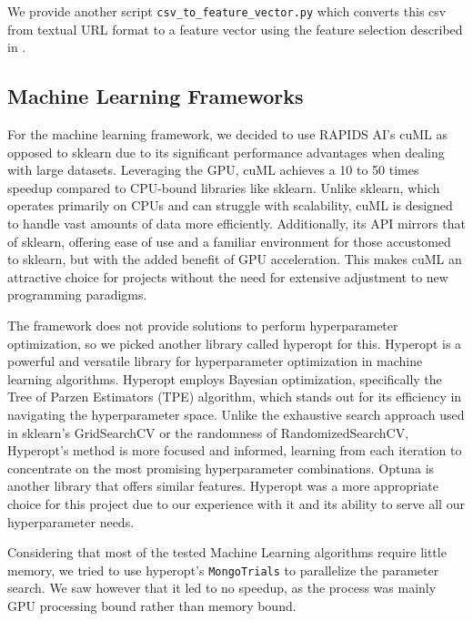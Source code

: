 \documentclass{article}
\begin{document}
    We provide another script \texttt{csv\_to\_feature\_vector.py} which converts this csv from textual URL format to a feature vector using the feature selection described in .

    \subsection{Machine Learning Frameworks}
    For the machine learning framework, we decided to use RAPIDS AI’s cuML as opposed to sklearn due to its significant performance advantages when dealing with large datasets.
    Leveraging the GPU, cuML achieves a 10 to 50 times speedup compared to CPU-bound libraries like sklearn.
    Unlike sklearn, which operates primarily on CPUs and can struggle with scalability, cuML is designed to handle vast amounts of data more efficiently.
    Additionally, its API mirrors that of sklearn, offering ease of use and a familiar environment for those accustomed to sklearn, but with the added benefit of GPU acceleration.
    This makes cuML an attractive choice for projects without the need for extensive adjustment to new programming paradigms.

    The framework does not provide solutions to perform hyperparameter optimization, so we picked another library called hyperopt for this.
    Hyperopt is a powerful and versatile library for hyperparameter optimization in machine learning algorithms.
    Hyperopt employs Bayesian optimization, specifically the Tree of Parzen Estimators (TPE) algorithm, which stands out for its efficiency in navigating the hyperparameter space.
    Unlike the exhaustive search approach used in sklearn's GridSearchCV or the randomness of RandomizedSearchCV, Hyperopt's method is more focused and informed, learning from each iteration to concentrate on the most promising hyperparameter combinations.
    Optuna is another library that offers similar features.
    Hyperopt was a more appropriate choice for this project due to our experience with it and its ability to serve all our hyperparameter needs.

    Considering that most of the tested Machine Learning algorithms require little memory, we tried to use hyperopt's \texttt{MongoTrials} to parallelize the parameter search.
    We saw however that it led to no speedup, as the process was mainly GPU processing bound rather than memory bound.
\end{document}
